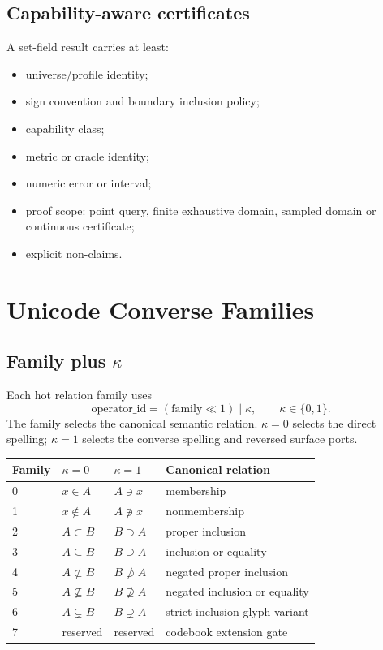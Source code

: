 \documentclass[11pt,a4paper]{article}
\begin{document}
\subsection{Capability-aware certificates}
A set-field result carries at least:
\begin{itemize}
\item universe/profile identity;
\item sign convention and boundary inclusion policy;
\item capability class;
\item metric or oracle identity;
\item numeric error or interval;
\item proof scope: point query, finite exhaustive domain, sampled domain or continuous certificate;
\item explicit non-claims.
\end{itemize}

\section{Unicode Converse Families}
\subsection{Family plus \texorpdfstring{\(\kappa\)}{kappa}}
Each hot relation family uses
\[
\mathrm{operator\_id}=(\mathrm{family}\ll 1)\;|\;\kappa,
\qquad \kappa\in\{0,1\}.
\]
The family selects the canonical semantic relation. \(\kappa=0\) selects the direct spelling; \(\kappa=1\) selects the converse spelling and reversed surface ports.

\begin{tabularx}{\textwidth}{P{22mm}P{35mm}P{35mm}Y}
\toprule
\textbf{Family} & \(\kappa=0\) & \(\kappa=1\) & \textbf{Canonical relation}\\
 & \(x\in A\) & \(A\ni x\) & membership\\
1 & \(x\notin A\) & \(A\not\ni x\) & nonmembership\\
2 & \(A\subset B\) & \(B\supset A\) & proper inclusion\\
3 & \(A\subseteq B\) & \(B\supseteq A\) & inclusion or equality\\
4 & \(A\not\subset B\) & \(B\not\supset A\) & negated proper inclusion\\
5 & \(A\nsubseteq B\) & \(B\nsupseteq A\) & negated inclusion or equality\\
6 & \(A\subsetneq B\) & \(B\supsetneq A\) & strict-inclusion glyph variant\\
7 & reserved & reserved & codebook extension gate\\
\bottomrule
\end{tabularx}
\end{document}

